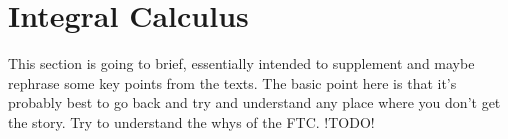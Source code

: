 \documentclass[12pt]{amsart}
\begin{document}
\section{Integral Calculus}

This section is going to brief, essentially intended to supplement and maybe rephrase some key points from the texts. The basic point here is that it's probably best to go back and try and understand any place where you don't get the story. Try to understand the whys of the FTC. !TODO!
\end{document}
